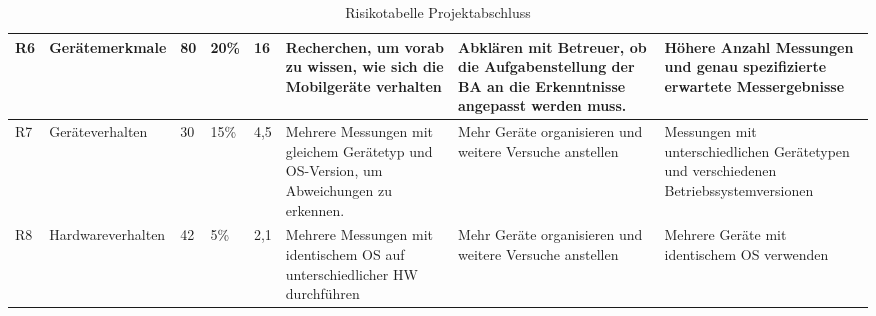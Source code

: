 \begin{landscape}
\begin{table}[h!]
\begin{tabularx}{\linewidth}{l l l l l X X X}
        \midrule 
        R6 & Gerätemerkmale & 80 & 20\% & 16 & Recherchen, um vorab zu wissen, wie sich die Mobilgeräte verhalten & Abklären mit Betreuer, ob die Aufgabenstellung der BA an die Erkenntnisse angepasst werden muss. & Höhere Anzahl Messungen und genau spezifizierte erwartete Messergebnisse \\ 
        \midrule 
        R7 & Geräteverhalten & 30 & 15\% & 4,5 & Mehrere Messungen mit gleichem Gerätetyp und OS-Version, um Abweichungen zu erkennen. & Mehr Geräte organisieren und weitere Versuche anstellen & Messungen mit unterschiedlichen Gerätetypen und verschiedenen Betriebssystemversionen \\ 
        \midrule 
        R8 & Hardwareverhalten & 42 & 5\% & 2,1 & Mehrere Messungen mit identischem OS auf unterschiedlicher HW durchführen & Mehr Geräte organisieren und weitere Versuche anstellen & Mehrere Geräte mit identischem OS verwenden \\
		\bottomrule
	\end{tabularx} 
	\caption{Risikotabelle Projektabschluss
	\label{table:riskend}} 
\end{table}  

\clearpage 


\end{landscape}
